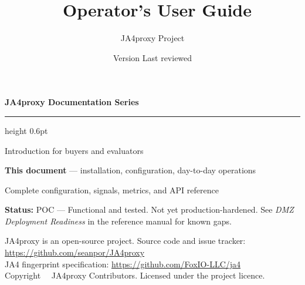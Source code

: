 \documentclass[a4paper, justified, twoside, notoc]{tufte-book}
\title{\ja\ Operator's User Guide}
\author{JA4proxy Project}
\date{Version \docversion \quad\textbullet\quad Last reviewed \lastreviewed}
\renewcommand{\maketitlepage}{%
  \begin{titlepage}
    \def\covertype{Operator's User Guide}
    \def\coverdescription{For Security Engineers and Operations Teams deploying JA4proxy}
    \def\coveraccentcolor{ja4cyan}
    
  \end{titlepage}
}
\begin{document}
\maketitlepage

\newpage
\thispagestyle{empty}
\vspace*{4cm}
{\noindent\Large\sffamily\bfseries\color{ja4navy} JA4proxy Documentation Series}
\vspace{0.5\baselineskip}
\hrule height 0.6pt
\vspace{0.8\baselineskip}

{\small\sffamily
\begin{description}[leftmargin=4cm, style=nextline]
  \item[Product Overview] Introduction for buyers and evaluators
  \item[\textbf{Operator's User Guide}] \textbf{This document} — installation, configuration, day-to-day operations
  \item[Technical Reference Manual] Complete configuration, signals, metrics, and API reference
\end{description}
}

\vspace{2\baselineskip}
{\small\noindent
\textbf{Status:} POC — Functional and tested. Not yet production-hardened.
See \emph{DMZ Deployment Readiness} in the reference manual for known gaps.
}

\vfill
{\footnotesize\sffamily\color{ja4gray}
JA4proxy is an open-source project. Source code and issue tracker:\\
\url{https://github.com/seanpor/JA4proxy}\\[4pt]
JA4 fingerprint specification: \url{https://github.com/FoxIO-LLC/ja4}\\[4pt]
Copyright \textcopyright\ \the\year\ JA4proxy Contributors. Licensed under the project licence.
}
\newpage

{
  \hypersetup{linkcolor=black}
  \setcounter{tocdepth}{2}
  \tableofcontents
}



\mainmatter










\end{document}
